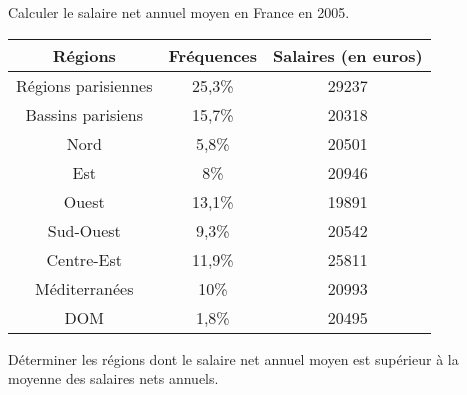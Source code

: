 
Calculer le salaire net annuel moyen en France en 2005.

\begin{tabular}{|c|c|c|}
\hline 
Régions & Fréquences & Salaires (en euros) \\ 
\hline 
Régions parisiennes & 25,3\%& 29237 \\ 
\hline 
Bassins parisiens & 15,7\% & 20318 \\ 
\hline 
Nord & 5,8\% & 20501 \\ 
\hline 
Est & 8\% & 20946 \\ 
\hline 
Ouest & 13,1\% & 19891 \\ 
\hline 
Sud-Ouest & 9,3\% & 20542 \\ 
\hline 
Centre-Est & 11,9\% & 25811 \\ 
\hline 
Méditerranées & 10\% & 20993 \\ 
\hline 
DOM & 1,8\% & 20495 \\ 
\hline 
\end{tabular} 

Déterminer les régions dont le salaire net annuel moyen est supérieur à la moyenne des salaires nets annuels.
